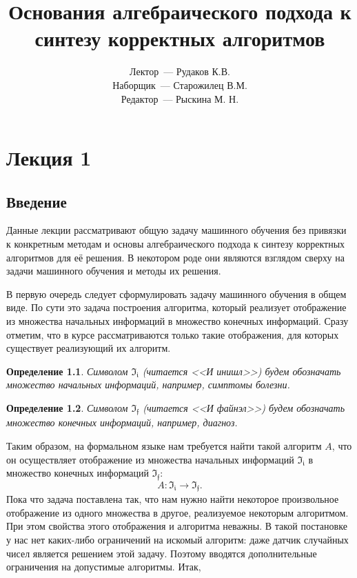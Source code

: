 \documentclass[a4paper, 12pt]{report}
\newtheorem{definition}{Определение}[chapter]
\begin{document}
\title{Основания алгебраического подхода к синтезу корректных алгоритмов}
\author{Лектор~--- Рудаков К.В.\\ Наборщик~--- Старожилец В.М.\\ Редактор~--- Рыскина М. Н.}
\date{}
\maketitle

\tableofcontents

\chapter{Лекция 1}
\section{Введение}
Данные лекции рассматривают общую задачу машинного обучения без привязки к конкретным методам и основы алгебраического подхода к синтезу корректных алгоритмов для её решения. В некотором роде они являются взглядом сверху на задачи машинного обучения и методы их решения.

В первую очередь следует сформулировать задачу машинного обучения в общем виде. По сути это задача построения алгоритма, который реализует отображение из множества начальных информаций в множество конечных информаций. Сразу отметим, что в курсе рассматриваются только такие отображения, для которых существует реализующий их алгоритм.

\begin{definition}
Символом $\mathfrak{I_i}$ (читается <<И инишл>>) будем обозначать множество начальных информаций, например, симптомы болезни.
\end{definition}

\begin{definition}
Символом $\mathfrak{I_f}$ (читается <<И файнэл>>) будем обозначать множество конечных информаций, например, диагноз.
\end{definition}

Таким образом, на формальном языке нам требуется найти такой алгоритм $A$, что он осуществляет отображение из множества начальных информаций $\mathfrak{I_i}$ в множество конечных информаций $\mathfrak{I_f}$:
\[
A: \mathfrak{I_i} \rightarrow \mathfrak{I_f}.
\]
Пока что задача поставлена так, что нам нужно найти некоторое произвольное отображение из одного множества в другое, реализуемое некоторым алгоритмом. При этом свойства этого отображения и алгоритма неважны. В такой постановке у нас нет каких-либо ограничений на искомый алгоритм: даже датчик случайных чисел является решением этой задачу. Поэтому вводятся дополнительные ограничения на допустимые алгоритмы. Итак,
\end{document}
